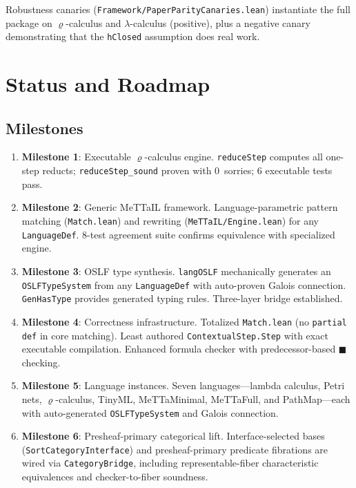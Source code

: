 \documentclass[]{article}
\newcommand{\code}[1]{\texttt{#1}}
\newcommand{\rhocalc}{\ensuremath{\varrho}}
\newcommand{\Bx}{\ensuremath{\blacksquare}}
\newcommand{\OSLF}{\textup{OSLF}}
\newcommand{\MeTTaIL}{\textup{MeTTaIL}}
\begin{document}
Robustness canaries (\code{Framework/PaperParityCanaries.lean}) instantiate the
full package on $\varrho$-calculus and $\lambda$-calculus (positive), plus a
negative canary demonstrating that the \code{hClosed} assumption does real work.

\section{Status and Roadmap}

\subsection{Milestones}

\begin{enumerate}
\item[\checkmark] \textbf{Milestone 1}: Executable \rhocalc{}-calculus engine.
  \code{reduceStep} computes all one-step reducts; \code{reduceStep\_sound} proven
  with 0~sorries; 6 executable tests pass.

\item[\checkmark] \textbf{Milestone 2}: Generic \MeTTaIL{} framework.
  Language-parametric pattern matching (\code{Match.lean}) and rewriting
  (\code{MeTTaIL/Engine.lean}) for any \code{LanguageDef}.
  8-test agreement suite confirms equivalence with specialized engine.

\item[\checkmark] \textbf{Milestone 3}: \OSLF{} type synthesis.
  \code{langOSLF} mechanically generates an \code{OSLFTypeSystem} from any
  \code{LanguageDef} with auto-proven Galois connection.  \code{GenHasType}
  provides generated typing rules.  Three-layer bridge established.

\item[\checkmark] \textbf{Milestone 4}: Correctness infrastructure.
  Totalized \code{Match.lean} (no \code{partial def} in core matching).
  Least authored \code{ContextualStep.Step} with exact executable compilation.
  Enhanced formula checker with predecessor-based $\Bx$ checking.

\item[\checkmark] \textbf{Milestone 5}: Language instances.
  Seven languages---lambda calculus, Petri nets, \rhocalc{}-calculus, TinyML,
  MeTTaMinimal, MeTTaFull, and PathMap---each with auto-generated \code{OSLFTypeSystem}
  and Galois connection.

\item[\checkmark] \textbf{Milestone 6}: Presheaf-primary categorical lift.
  Interface-selected bases (\code{SortCategoryInterface}) and presheaf-primary
  predicate fibrations are wired via \code{CategoryBridge}, including
  representable-fiber characteristic equivalences and checker-to-fiber soundness.


\end{enumerate}
\end{document}
